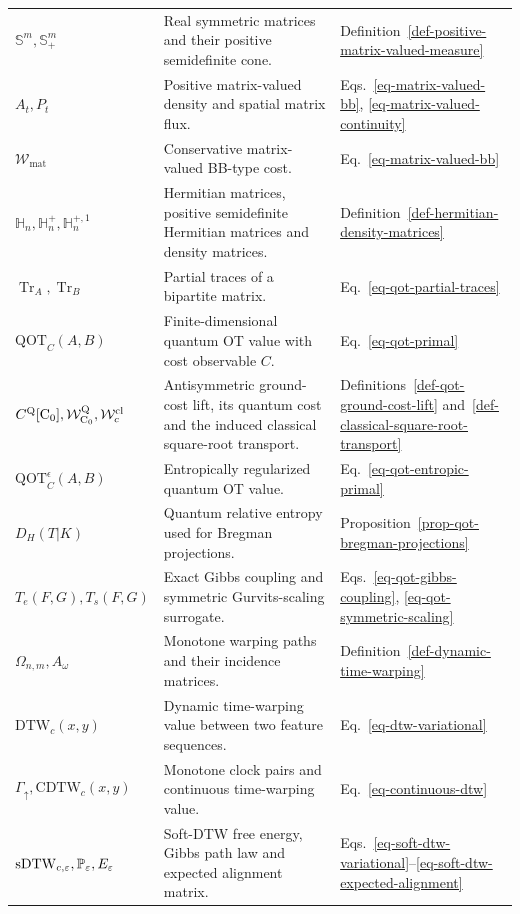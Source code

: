 {\begin{longtable}{>{\raggedright\arraybackslash}p{}
                  >{\raggedright\arraybackslash}p{}
                  >{\raggedright\arraybackslash}p{}}
$\mathbb S^m,\mathbb S_+^m$ & Real symmetric matrices and their positive semidefinite cone. & Definition~\ref{def-positive-matrix-valued-measure} \\
$A_t,P_t$ & Positive matrix-valued density and spatial matrix flux. & Eqs.~\eqref{eq-matrix-valued-bb}, \eqref{eq-matrix-valued-continuity} \\
$\mathcal W_{\mathrm{mat}}$ & Conservative matrix-valued BB-type cost. & Eq.~\eqref{eq-matrix-valued-bb} \\
$\mathbb H_n,\mathbb H_n^+,\mathbb H_n^{+,1}$ & Hermitian matrices, positive semidefinite Hermitian matrices and density matrices. & Definition~\ref{def-hermitian-density-matrices} \\
$\operatorname{Tr}_A,\operatorname{Tr}_B$ & Partial traces of a bipartite matrix. & Eq.~\eqref{eq-qot-partial-traces} \\
$\mathrm{QOT}_C(A,B)$ & Finite-dimensional quantum OT value with cost observable $C$. & Eq.~\eqref{eq-qot-primal} \\
$C^{\mathrm Q}[\mathrm{C}_0],\mathcal W_{\mathrm{C}_0}^{\mathrm Q},\mathcal W_c^{\mathrm{cl}}$ & Antisymmetric ground-cost lift, its quantum cost and the induced classical square-root transport. & Definitions~\ref{def-qot-ground-cost-lift} and~\ref{def-classical-square-root-transport} \\
$\mathrm{QOT}_C^\epsilon(A,B)$ & Entropically regularized quantum OT value. & Eq.~\eqref{eq-qot-entropic-primal} \\
$D_H(T|K)$ & Quantum relative entropy used for Bregman projections. & Proposition~\ref{prop-qot-bregman-projections} \\
$T_e(F,G),T_s(F,G)$ & Exact Gibbs coupling and symmetric Gurvits-scaling surrogate. & Eqs.~\eqref{eq-qot-gibbs-coupling}, \eqref{eq-qot-symmetric-scaling} \\
$\Omega_{n,m},A_\omega$ & Monotone warping paths and their incidence matrices. & Definition~\ref{def-dynamic-time-warping} \\
$\mathrm{DTW}_c(x,y)$ & Dynamic time-warping value between two feature sequences. & Eq.~\eqref{eq-dtw-variational} \\
$\Gamma_\uparrow,\mathrm{CDTW}_c(x,y)$ & Monotone clock pairs and continuous time-warping value. & Eq.~\eqref{eq-continuous-dtw} \\
$\mathrm{sDTW}_{c,\varepsilon},\mathbb{P}_\varepsilon,E_\varepsilon$ & Soft-DTW free energy, Gibbs path law and expected alignment matrix. & Eqs.~\eqref{eq-soft-dtw-variational}--\eqref{eq-soft-dtw-expected-alignment} \\


\end{longtable}}
